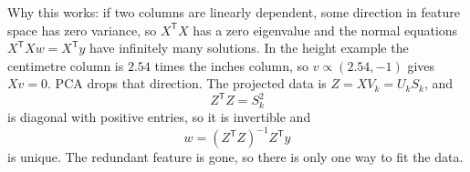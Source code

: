 \documentclass[11pt]{article}
\newcommand{\T}{\mathsf{T}}
\begin{document}
Why this works: if two columns are linearly dependent, some direction in feature space has zero variance, so $X^\T X$ has a zero eigenvalue and the normal equations $X^\T X w = X^\T y$ have infinitely many solutions. In the height example the centimetre column is $2.54$ times the inches column, so $v \propto (2.54, -1)$ gives $Xv = 0$. PCA drops that direction. The projected data is $Z = X V_k = U_k S_k$, and
\[
  Z^\T Z = S_k^2
\]
is diagonal with positive entries, so it is invertible and
\[
  w = (Z^\T Z)^{-1} Z^\T y
\]
is unique. The redundant feature is gone, so there is only one way to fit the data.
\end{document}
